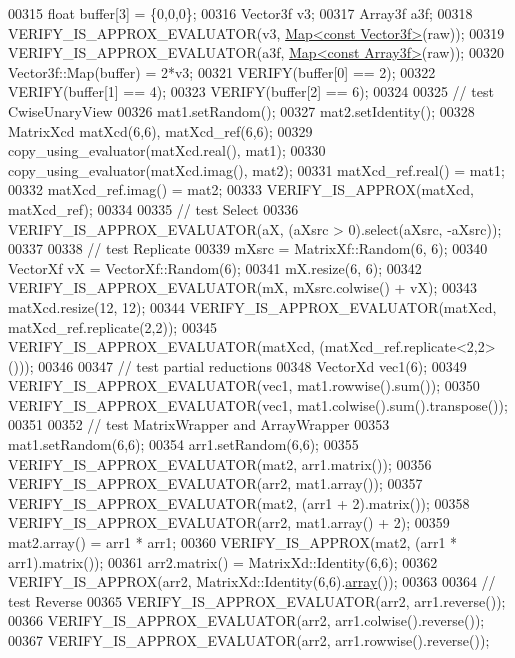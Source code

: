\begin{DoxyCode}
00315     \textcolor{keywordtype}{float} buffer[3] = \{0,0,0\};
00316     Vector3f v3;
00317     Array3f a3f;
00318     VERIFY\_IS\_APPROX\_EVALUATOR(v3, \hyperlink{group___core___module_class_eigen_1_1_map}{Map<const Vector3f>}(raw));
00319     VERIFY\_IS\_APPROX\_EVALUATOR(a3f, \hyperlink{group___core___module_class_eigen_1_1_map}{Map<const Array3f>}(raw));
00320     Vector3f::Map(buffer) = 2*v3;
00321     VERIFY(buffer[0] == 2);
00322     VERIFY(buffer[1] == 4);
00323     VERIFY(buffer[2] == 6);
00324 
00325     \textcolor{comment}{// test CwiseUnaryView}
00326     mat1.setRandom();
00327     mat2.setIdentity();
00328     MatrixXcd matXcd(6,6), matXcd\_ref(6,6);
00329     copy\_using\_evaluator(matXcd.real(), mat1);
00330     copy\_using\_evaluator(matXcd.imag(), mat2);
00331     matXcd\_ref.real() = mat1;
00332     matXcd\_ref.imag() = mat2;
00333     VERIFY\_IS\_APPROX(matXcd, matXcd\_ref);
00334 
00335     \textcolor{comment}{// test Select}
00336     VERIFY\_IS\_APPROX\_EVALUATOR(aX, (aXsrc > 0).select(aXsrc, -aXsrc));
00337 
00338     \textcolor{comment}{// test Replicate}
00339     mXsrc = MatrixXf::Random(6, 6);
00340     VectorXf vX = VectorXf::Random(6);
00341     mX.resize(6, 6);
00342     VERIFY\_IS\_APPROX\_EVALUATOR(mX, mXsrc.colwise() + vX);
00343     matXcd.resize(12, 12);
00344     VERIFY\_IS\_APPROX\_EVALUATOR(matXcd, matXcd\_ref.replicate(2,2));
00345     VERIFY\_IS\_APPROX\_EVALUATOR(matXcd, (matXcd\_ref.replicate<2,2>()));
00346 
00347     \textcolor{comment}{// test partial reductions}
00348     VectorXd vec1(6);
00349     VERIFY\_IS\_APPROX\_EVALUATOR(vec1, mat1.rowwise().sum());
00350     VERIFY\_IS\_APPROX\_EVALUATOR(vec1, mat1.colwise().sum().transpose());
00351 
00352     \textcolor{comment}{// test MatrixWrapper and ArrayWrapper}
00353     mat1.setRandom(6,6);
00354     arr1.setRandom(6,6);
00355     VERIFY\_IS\_APPROX\_EVALUATOR(mat2, arr1.matrix());
00356     VERIFY\_IS\_APPROX\_EVALUATOR(arr2, mat1.array());
00357     VERIFY\_IS\_APPROX\_EVALUATOR(mat2, (arr1 + 2).matrix());
00358     VERIFY\_IS\_APPROX\_EVALUATOR(arr2, mat1.array() + 2);
00359     mat2.array() = arr1 * arr1;
00360     VERIFY\_IS\_APPROX(mat2, (arr1 * arr1).matrix());
00361     arr2.matrix() = MatrixXd::Identity(6,6);
00362     VERIFY\_IS\_APPROX(arr2, MatrixXd::Identity(6,6).\hyperlink{class_eigen_1_1array}{array}());
00363 
00364     \textcolor{comment}{// test Reverse}
00365     VERIFY\_IS\_APPROX\_EVALUATOR(arr2, arr1.reverse());
00366     VERIFY\_IS\_APPROX\_EVALUATOR(arr2, arr1.colwise().reverse());
00367     VERIFY\_IS\_APPROX\_EVALUATOR(arr2, arr1.rowwise().reverse());

\end{DoxyCode}

